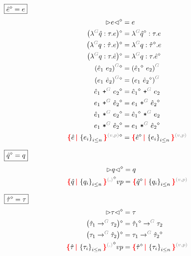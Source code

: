 \noindent $\boxed{\hat{e}\mathclose{}^{\diamond}\mathclose{} = e}$
%
\begin{align*}
  \erase{\cursor{e}} &= e \\
  \erase{\left(\eFun{G}{\Z{q}}{\tau}{e}\right)} &= \eFun{G}{\erase{\Z{q}}}{\tau}{e} \\
  \erase{\left(\eFun{G}{q}{\Z{\tau}}{e}\right)} &= \eFun{G}{q}{\erase{\Z{\tau}}}{e} \\
  \erase{\left(\eFun{G}{q}{\tau}{\Z{e}}\right)} &= \eFun{G}{q}{\tau}{\erase{\Z{e}}} \\
  \erase{\eApp{G}{\Z{e}_1}{e_2}} &= \eApp{G}{\erase{\Z{e}_1}}{e_2} \\
  \erase{\eApp{G}{e_1}{\Z{e}_2}} &= \eApp{G}{e_1}{\erase{\Z{e}_2}} \\
  \erase{\ePlus{G}{\Z{e}_1}{e_2}} &= \ePlus{G}{\erase{\Z{e}_1}}{e_2} \\
  \erase{\ePlus{G}{e_1}{\Z{e}_2}} &= \ePlus{G}{e_1}{\erase{\Z{e}_2}} \\
  \erase{\eTimes{G}{\Z{e}_1}{e_2}} &= \eTimes{G}{\erase{\Z{e}_1}}{e_2} \\
  \erase{\eTimes{G}{e_1}{\Z{e}_2}} &= \eTimes{G}{e_1}{\erase{\Z{e}_2}} \\
  \erase{\conflictHole{\Z{e}, \SetOf{e_i}_{i \leq n}}{v}{p}} &= \conflictHole{\erase{\Z{e}}, \SetOf{e_i}_{i \leq n}}{v}{p}
\end{align*}

\noindent $\boxed{\hat{q}\mathclose{}^{\diamond}\mathclose{} = q}$
%
\begin{align*}
  \erase{\cursor{q}} &= q \\
  \erase{\conflictHole{\Z{q}, \SetOf{q_i}_{i \leq n}}}{v}{p} &= \conflictHole{\erase{\Z{q}}, \SetOf{q_i}_{i \leq n}}{v}{p}
\end{align*}

\noindent $\boxed{\hat{\tau}\mathclose{}^{\diamond}\mathclose{} = \tau}$
%
\begin{align*}
  \erase{\cursor{\tau}} &= \tau \\
  \erase{\left(\tArrow{G}{\Z{\tau}_1}{\tau_2}\right)} &= \tArrow{G}{\erase{\Z{\tau}_1}}{\tau_2} \\
  \erase{\left(\tArrow{G}{\tau_1}{\Z{\tau}_2}\right)} &= \tArrow{G}{\tau_1}{\erase{\Z{\tau}_2}} \\
  \erase{\conflictHole{\Z{\tau}, \SetOf{\tau_i}_{i \leq n}}}{v}{p} &= \conflictHole{\erase{\Z{\tau}}, \SetOf{\tau_i}_{i \leq n}}{v}{p}
\end{align*}


